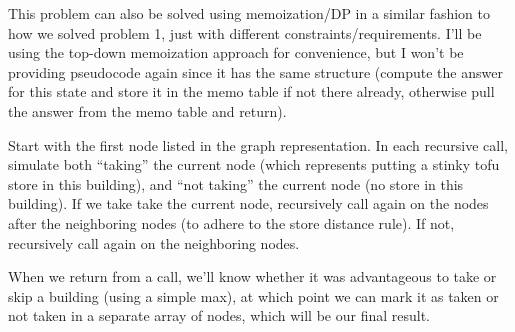 \documentclass[12pt]{article}
\begin{document}
\begin{enumerate}
    This problem can also be solved using memoization/DP in a similar fashion to how we solved problem 1, just with different constraints/requirements. I'll be using the top-down memoization approach for convenience, but I won't be providing pseudocode again since it has the same structure (compute the answer for this state and store it in the memo table if not there already, otherwise pull the answer from the memo table and return).
    
    Start with the first node listed in the graph representation. In each recursive call, simulate both ``taking'' the current node (which represents putting a stinky tofu store in this building), and ``not taking'' the current node (no store in this building). If we take take the current node, recursively call again on the nodes after the neighboring nodes (to adhere to the store distance rule). If not, recursively call again on the neighboring nodes.
    
    When we return from a call, we'll know whether it was advantageous to take or skip a building (using a simple max), at which point we can mark it as taken or not taken in a separate array of nodes, which will be our final result.

\end{enumerate}
\end{document}
